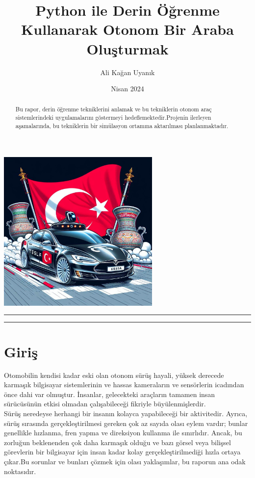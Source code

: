 \documentclass{article}
\title{Python ile Derin Öğrenme Kullanarak Otonom Bir Araba Oluşturmak}
\author{Ali Kağan Uyanık}
\date{Nisan 2024}
\begin{document}
\begin{titlingpage}
    \maketitle
    \begin{center}
        \includegraphics[width=0.6\textwidth]{image/keslakutahyada.jpg} %
    \end{center}
    \vfill
    \rule{\textwidth}{0.5pt}
    \renewcommand{\abstractname}{Özet}
    \begin{abstract}
        \noindent Bu rapor, derin öğrenme tekniklerini anlamak ve bu tekniklerin otonom araç sistemlerindeki uygulamalarını göstermeyi hedeflemektedir.Projenin ilerleyen aşamalarında, bu tekniklerin bir simülasyon ortamına aktarılması planlanmaktadır.
    \end{abstract}
    \rule{\textwidth}{0.5pt}
    \vfill
\end{titlingpage}
\newpage
\section{Giriş}
\noindent Otomobilin kendisi kadar eski olan otonom sürüş hayali, yüksek derecede karmaşık bilgisayar sistemlerinin ve hassas kameraların ve sensörlerin icadından önce dahi var olmuştur. İnsanlar, gelecekteki araçların tamamen insan sürücüsünün etkisi olmadan çalışabileceği fikriyle büyülenmişlerdir.\\[5pt]
Sürüş neredeyse herhangi bir insanın kolayca yapabileceği bir aktivitedir. Ayrıca, sürüş sırasında gerçekleştirilmesi gereken çok az sayıda olası eylem vardır; bunlar genellikle hızlanma, fren yapma ve direksiyon kullanma ile sınırlıdır. Ancak, bu zorluğun beklenenden çok daha karmaşık olduğu ve bazı görsel veya bilişsel görevlerin bir bilgisayar için insan kadar kolay gerçekleştirilmediği hızla ortaya çıkar.Bu sorunlar ve bunları çözmek için olası yaklaşımlar, bu raporun ana odak noktasıdır.
\end{document}
